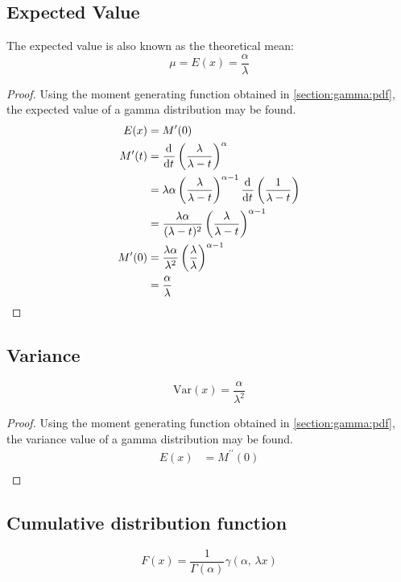 \documentclass[12pt]{article}
\begin{document}
\subsection{Expected Value}
The expected value is also known as the theoretical mean:
\begin{equation*}\label{eq:gamma-expected-value-2}
	\mu = E(x) = \frac{\alpha}{\lambda}
\end{equation*}
\begin{proof}
	Using the moment generating function obtained in \autoref{section:gamma:pdf}, the expected value of a gamma
	distribution may be found.
	\begin{equation*}
		\begin{split}
			E(x)		&=	M^\prime(0)\\
			M^\prime(t)	&=	\mathop{}\!\frac{\mathrm{d}^{}}{\mathrm{d}t^{}}\left(\frac{\lambda}{\lambda - t}\right)^\alpha\\
						&=	\lambda\alpha\left(\frac{\lambda}{\lambda - t}\right)^{\alpha-1}\mathop{}\!\frac{\mathrm{d}^{}}{\mathrm{d}t^{}}\left(\frac{1}{\lambda - t}\right)\\
						&=	\frac{\lambda\alpha}{(\lambda - t)^2}\left(\frac{\lambda}{\lambda - t}\right)^{\alpha-1}\\
			M^\prime(0)	&=	\frac{\lambda\alpha}{\lambda^2}\left(\frac{\lambda}{\lambda}\right)^{\alpha-1}\\
						&=	\frac{\alpha}{\lambda}\\
		\end{split}
	\end{equation*}
\end{proof}

\subsection{Variance}
\begin{equation*}\label{eq:gamma-variance-2}
	\text{Var}(x) = \frac{\alpha}{\lambda^2}
\end{equation*}
\begin{proof}
	Using the moment generating function obtained in \autoref{section:gamma:pdf}, the variance value of a gamma
	distribution may be found.
	\begin{equation*}
		\begin{split}
			E(x)	&=	M^{\prime\prime}(0)\\
		\end{split}
	\end{equation*}
\end{proof}

\subsection{Cumulative distribution function}
\begin{equation*}\label{eq:gamma-cdf-2}
	F(x) = \frac{1}{\Gamma(\alpha)}\gamma(\alpha,\, \lambda x)
\end{equation*}
\end{document}
